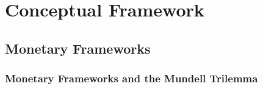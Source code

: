 \documentclass{beamer}
\begin{document}
\section{Conceptual Framework}

\subsection{Monetary Frameworks}

\begin{frame}
  \frametitle{Monetary Frameworks and the Mundell Trilemma}
\end{frame}
\end{document}
